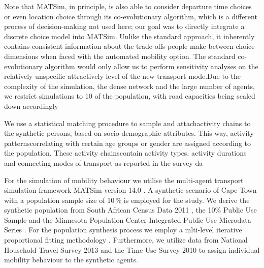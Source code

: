 \documentclass[a4paper]{article}
\begin{document}
Note that MATSim, in
principle, is also able to consider departure time choices or even location choice through its co-evolutionary algorithm, which is a
different process of decision-making not used here; our goal was to directly integrate a discrete choice model into MATSim. Unlike the
standard approach, it inherently contains consistent information about the trade-offs people make between choice dimensions when
faced with the automated mobility option. The standard co-evolutionary algorithm would only allow us to perform sensitivity analyses
on the relatively unspecific attractively level of the new transport mode.Due to the complexity of the simulation, the dense network and the large number of agents, we restrict simulations to 10%
of the population, with road capacities being scaled down accordingly


We use a statistical matching procedure to sample and attachactivity chains to the synthetic persons, based on socio-demographic attributes. This way, activity patternscorrelating with certain age groups or gender are assigned according to the population. These activity chainscontain activity types, activity durations and connecting modes of transport as reported in the survey da

For the simulation of mobility behaviour we utilise the multi-agent transport simulation framework MATSim version 14.0 \citep{Horni.2016}. A synthetic scenario of Cape Town with a population sample size of 10\,\% is employed for the study. We derive the synthetic population from South African Census Data 2011 \citep{census2011}, the 10\% Public Use Sample \citep{census2011public10pct} and the Minnesota Population Center Integrated Public Use Microdata Series \citep{mpc2020}. For the population synthesis process we employ a mlti-level iterative proportional fitting methodology \citep{joubert2014mipf}. Furthermore, we utilize data from National Household Travel Survey 2013 \citep{nhts2013} and the Time Use Survey 2010 \citep{tus2013} to assign individual mobility behaviour to the synthetic agents.  \\
\end{document}

